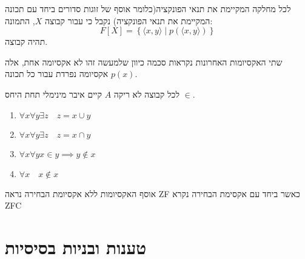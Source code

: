 \documentclass{tstextbook}
\begin{document}
\begin{definition}
לכל מחלקה המקיימת את תנאי הפונקציה(כלומר אוסף של זוגות סדורים ביחד עם תכונה המקיימת את תנאי הפונקציה) נקבל כי עבור קבוצה \(X\), התמונה:
$$F[X]=\left\{  \langle x,y \rangle \mid p\left( \langle x,y \rangle  \right)  \right\}$$
תהיה קבוצה.

\end{definition}
\begin{remark}
שתי האקסיומות האחרונות נקראות סכמה כיוון שלמעשה זהו לא אקסיומה אחת, אלה אקסיומה נפרדת עבור כל תכונה \(p(x)\).

\end{remark}
\begin{definition}
לכל קבוצה לא ריקה \(A\) קיים איבר מינימלי תחת היחס \(\in\). 

\end{definition}
\begin{corollary}
  \begin{enumerate}
    \item \(\forall x\forall y \exists z\quad z = x\cup y\)


    \item \(\forall x\forall y \exists z\quad z=x\cap y\)


    \item \(\forall x \forall y x \in y \implies y \not \in x\)


    \item \(\forall x \quad x \not \in x\)


  \end{enumerate}
\end{corollary}
\begin{remark}
אוסף האקסיומות ללא אקסיומת הבחירה נראה ZF כאשר ביחד עם אקסימת הבחירה נקרא ZFC

\end{remark}
\section{טענות ובניות בסיסיות}
\end{document}
